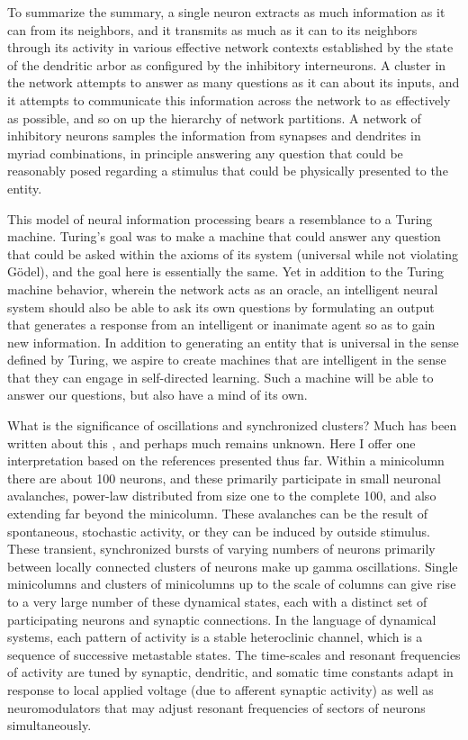 \documentclass[twocolumn]{article}
\begin{document}
To summarize the summary, a single neuron extracts as much information as it can from its neighbors, and it transmits as much as it can to its neighbors through its activity in various effective network contexts established by the state of the dendritic arbor as configured by the inhibitory interneurons. A cluster in the network attempts to answer as many questions as it can about its inputs, and it attempts to communicate this information across the network to as effectively as possible, and so on up the hierarchy of network partitions. A network of inhibitory neurons samples the information from synapses and dendrites in myriad combinations, in principle answering any question that could be reasonably posed regarding a stimulus that could be physically presented to the entity. 

This model of neural information processing bears a resemblance to a Turing machine. Turing's goal was to make a machine that could answer any question that could be asked within the axioms of its system (universal while not violating G\"{o}del), and the goal here is essentially the same. Yet in addition to the Turing machine behavior, wherein the network acts as an oracle, an intelligent neural system should also be able to ask its own questions by formulating an output that generates a response from an intelligent or inanimate agent so as to gain new information. In addition to generating an entity that is universal in the sense defined by Turing, we aspire to create machines that are intelligent in the sense that they can engage in self-directed learning. Such a machine will be able to answer our questions, but also have a mind of its own.

\vspace{3em}
What is the significance of oscillations and synchronized clusters? Much has been written about this \cite{}, and perhaps much remains unknown. Here I offer one interpretation based on the references presented thus far. Within a minicolumn there are about 100 neurons, and these primarily participate in small neuronal avalanches, power-law distributed from size one to the complete 100, and also extending far beyond the minicolumn. These avalanches can be the result of spontaneous, stochastic activity, or they can be induced by outside stimulus. These transient, synchronized bursts of varying numbers of neurons primarily between locally connected clusters of neurons make up gamma oscillations. Single minicolumns and clusters of minicolumns up to the scale of columns can give rise to a very large number of these dynamical states, each with a distinct set of participating neurons and synaptic connections. In the language of dynamical systems, each pattern of activity is a stable heteroclinic channel, which is a sequence of successive metastable states. The time-scales and resonant frequencies of activity are tuned by synaptic, dendritic, and somatic time constants adapt in response to local applied voltage (due to afferent synaptic activity) as well as neuromodulators that may adjust resonant frequencies of sectors of neurons simultaneously.
\end{document}
